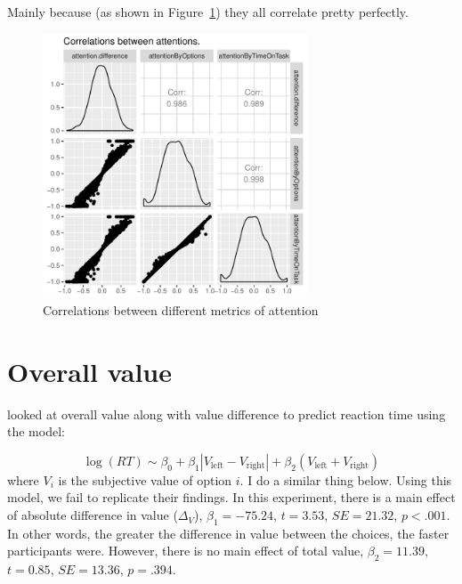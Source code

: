 \documentclass[12pt]{article}
\begin{document}


Mainly because (as shown in Figure~\ref{figure:attentionCorrelations}) they all correlate pretty perfectly. 

\begin{figure}
	\centering
	\includegraphics[width=0.7\textwidth]{images/attentionCorrelations}
	\caption{Correlations between different metrics of attention}
	\label{figure:attentionCorrelations}
\end{figure}

\clearpage
\section{Overall value}

 looked at overall value along with value difference to predict reaction time using the model:

\begin{equation}
	\log(RT) \sim \beta_0 + \beta_1|V_\text{left} - V_\text{right}| + \beta_2(V_\text{left} + V_\text{right})
\end{equation}
where $V_i$ is the subjective value of option $i$. I do a similar thing below. Using this model, we fail to replicate their findings. In this experiment, there is a main effect of absolute difference in value ($\Delta_V$), $\beta_1=-75.24$, $t=3.53$, $SE=21.32$, $p<.001$. In other words, the greater the difference in value between the choices, the faster participants were. However, there is no main effect of total value, $\beta_2=11.39$, $t=0.85$, $SE=13.36$, $p=.394$.


\end{document}
